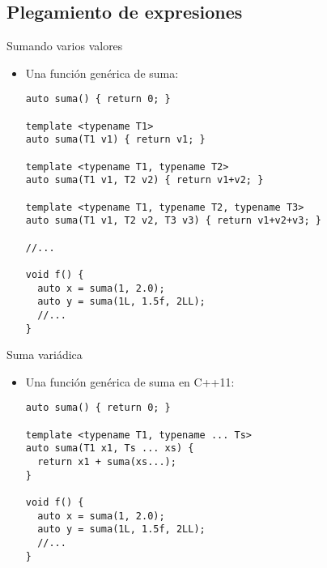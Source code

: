 \subsection{Plegamiento de expresiones}

\begin{frame}[t,fragile]{Sumando varios valores}
\begin{itemize}
  \item Una función genérica de suma:
\begin{lstlisting}
auto suma() { return 0; }

template <typename T1>
auto suma(T1 v1) { return v1; }

template <typename T1, typename T2>
auto suma(T1 v1, T2 v2) { return v1+v2; }

template <typename T1, typename T2, typename T3>
auto suma(T1 v1, T2 v2, T3 v3) { return v1+v2+v3; }

//...

void f() {
  auto x = suma(1, 2.0);
  auto y = suma(1L, 1.5f, 2LL);
  //...
}
\end{lstlisting}
\end{itemize}
\end{frame}

\begin{frame}[t,fragile]{Suma variádica}
\begin{itemize}
  \item Una función genérica de suma en C++11:
\begin{lstlisting}
auto suma() { return 0; }

template <typename T1, typename ... Ts>
auto suma(T1 x1, Ts ... xs) {
  return x1 + suma(xs...);
}

void f() {
  auto x = suma(1, 2.0);
  auto y = suma(1L, 1.5f, 2LL);
  //...
}
\end{lstlisting}
\end{itemize}
\end{frame}

